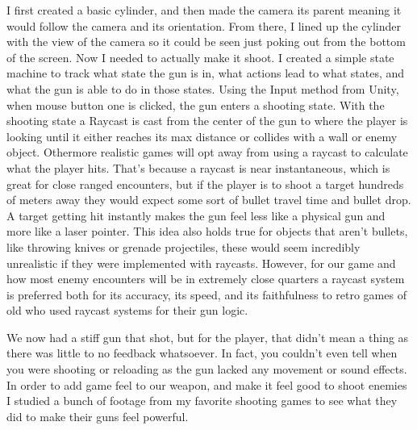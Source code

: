 \documentclass[10pt,twocolumn]{article}
\begin{document}
I first created a basic cylinder, and then made the camera its parent meaning it would follow the camera and its orientation. From there, I lined up the cylinder with the view of the camera so it could be seen just poking out from the bottom of the screen. Now I needed to actually make it shoot. I created a simple state machine to track what state the gun is in, what actions lead to what states, and what the gun is able to do in those states. Using the Input method from Unity, when mouse button one is clicked, the gun enters a shooting state. With the shooting state a Raycast is cast from the center of the gun to where the player is looking until it either reaches its max distance or collides with a wall or enemy object. Othermore realistic games will opt away from using a raycast to calculate what the player hits. That’s because a raycast is near instantaneous, which is great for close ranged encounters, but if the player is to shoot a target hundreds of meters away they would expect some sort of bullet travel time and bullet drop. A target getting hit instantly makes the gun feel less like a physical gun and more like a laser pointer. This idea also holds true for objects that aren’t bullets, like throwing knives or grenade projectiles, these would seem incredibly unrealistic if they were implemented with raycasts. However, for our game and how most enemy encounters will be in extremely close quarters a raycast system is preferred both for its accuracy, its speed, and its faithfulness to retro games of old who used raycast systems for their gun logic.

We now had a stiff gun that shot, but for the player, that didn’t mean a thing as there was little to no feedback whatsoever. In fact, you couldn’t even tell when you were shooting or reloading as the gun lacked any movement or sound effects. In order to add game feel to our weapon, and make it feel good to shoot enemies I studied a bunch of footage from my favorite shooting games to see what they did to make their guns feel powerful.
\end{document}

